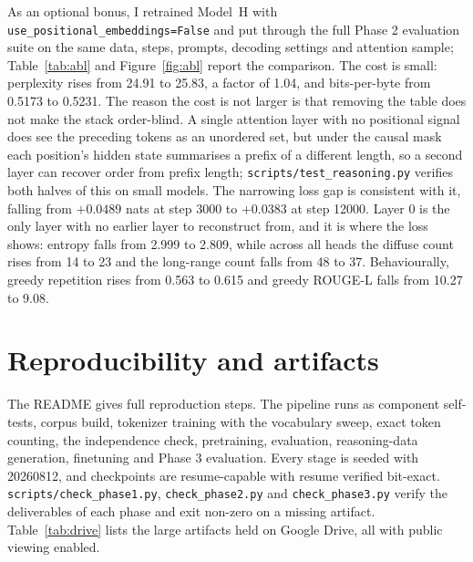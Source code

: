 \documentclass[10pt,a4paper]{article}
\begin{document}
As an optional bonus, I retrained Model~H with
\texttt{use\_positional\_embeddings=False} and put through the full Phase 2
evaluation suite on the same data, steps, prompts, decoding settings and
attention sample; Table~\ref{tab:abl} and Figure~\ref{fig:abl} report the
comparison. The cost is small: perplexity rises from 24.91 to 25.83, a
factor of 1.04, and bits-per-byte from 0.5173 to 0.5231. The reason the cost is
not larger is that removing the table does not make the stack order-blind. A
single attention layer with no positional signal does see the preceding tokens as
an unordered set, but under the causal mask each position's hidden state
summarises a prefix of a different length, so a second layer can recover order
from prefix length; \texttt{scripts/test\_reasoning.py} verifies both halves of
this on small models. The narrowing loss gap is consistent with it, falling from
$+0.0489$ nats at step \num{3000} to $+0.0383$ at step \num{12000}. Layer 0 is
the only layer with no earlier layer to reconstruct from, and it is where the
loss shows: entropy falls from 2.999 to 2.809, while across all heads the diffuse
count rises from \num{14} to \num{23} and the long-range count falls from
\num{48} to \num{37}. Behaviourally, greedy repetition rises from 0.563 to 0.615
and greedy ROUGE-L falls from 10.27 to 9.08.

\section{Reproducibility and artifacts}\label{sec:repro}

The README gives full reproduction steps. The pipeline runs as component
self-tests, corpus build, tokenizer training with the vocabulary sweep, exact
token counting, the independence check, pretraining, evaluation, reasoning-data
generation, finetuning and Phase 3 evaluation. Every stage is seeded with
\num{20260812}, and checkpoints are resume-capable with resume verified
bit-exact. \texttt{scripts/check\_phase1.py}, \texttt{check\_phase2.py} and
\texttt{check\_phase3.py} verify the deliverables of each phase and exit non-zero
on a missing artifact. Table~\ref{tab:drive} lists the large artifacts held on
Google Drive, all with public viewing enabled.
\end{document}

